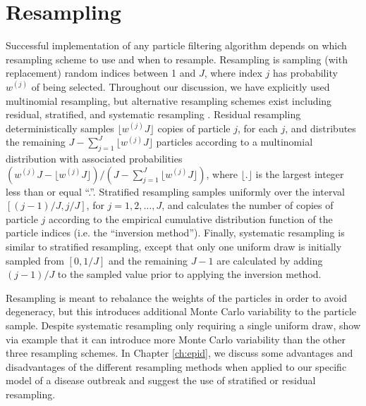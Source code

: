\section{Resampling \label{sec:resample}}

Successful implementation of any particle filtering algorithm depends on which resampling scheme to use and when to resample. Resampling is sampling (with replacement) random indices between 1 and $J$, where index $j$ has probability $w^{(j)}$ of being selected. Throughout our discussion, we have explicitly used multinomial resampling, but alternative resampling schemes exist including residual, stratified, and systematic resampling \citep{Douc:Capp:Moul:comp:2005}. Residual resampling deterministically samples $\lfloor w^{(j)} J \rfloor$ copies of particle $j$, for each $j$, and distributes the remaining $J - \sum^J_{j=1} \lfloor w^{(j)} J \rfloor$  particles according to a multinomial distribution with associated probabilities $(w^{(j)} J - \lfloor w^{(j)} J \rfloor) / (J - \sum^J_{j=1} \lfloor w^{(j)} J \rfloor)$, where $\lfloor . \rfloor$ is the largest integer less than or equal ``.''. Stratified resampling samples uniformly over the interval $[(j-1) / J, j / J]$, for $j = 1, 2, \ldots, J$, and calculates the number of copies of particle $j$ according to the empirical cumulative distribution function of the particle indices (i.e. the ``inversion method''). Finally, systematic resampling is similar to stratified resampling, except that only one uniform draw is initially sampled from $[0, 1/J]$ and the remaining $J-1$ are calculated by adding $(j-1) / J$ to the sampled value prior to applying the inversion method.

Resampling is meant to rebalance the weights of the particles in order to avoid degeneracy, but this introduces additional Monte Carlo variability to the particle sample. Despite systematic resampling only requiring a single uniform draw, \citet{Douc:Capp:Moul:comp:2005} show via example that it can introduce more Monte Carlo variability than the other three resampling schemes. In Chapter \ref{ch:epid}, we discuss some advantages and disadvantages of the different resampling methods when applied to our specific model of a disease outbreak and suggest the use of stratified or residual resampling.

